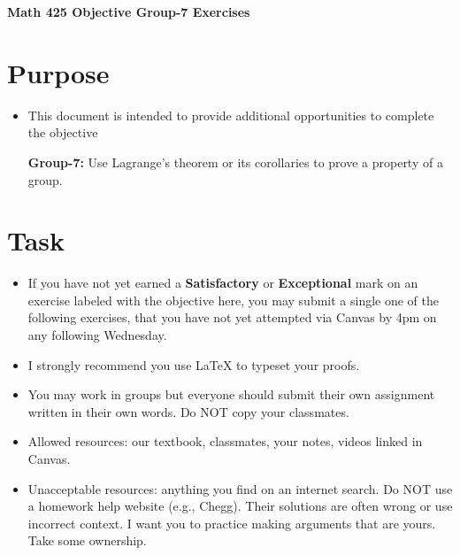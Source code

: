 \documentclass[12pt]{article}
\begin{document}
	\begin{center}
		{\Large \bf Math 425 Objective Group-7 Exercises}
	\end{center}
	\section*{Purpose}
	\begin{itemize}
		\item This document is intended to provide additional opportunities to complete the objective
		
		\textbf{Group-7:} Use Lagrange’s theorem or its corollaries to prove a property of a group.
	\end{itemize}
	\section*{Task}
	\begin{itemize}
		\item If you have not yet earned a \textbf{Satisfactory} or \textbf{Exceptional} mark on an exercise labeled with the objective here, you may submit a single one of the following exercises, that you have not yet attempted via Canvas by 4pm on any following Wednesday.
		\item I strongly recommend you use LaTeX to typeset your proofs.
		\item You may work in groups but everyone should submit their own assignment written in their own words.  Do NOT copy your classmates.
		\item Allowed resources: our textbook, classmates, your notes, videos linked in Canvas.
		\item Unacceptable resources: anything you find on an internet search. Do NOT use a homework help website (e.g., Chegg). Their solutions are often wrong or use incorrect context.  I want you to practice making arguments that are yours. Take some ownership.
	\end{itemize}
\end{document}

